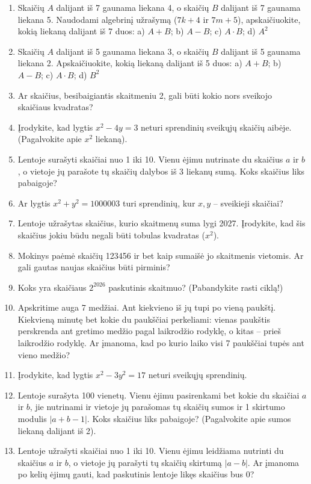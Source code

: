 \documentclass[11pt,a4paper]{scrartcl}
\begin{document}
\begin{enumerate}
    \renewcommand{\labelenumi}{\textbf{\theenumi.}}
    \item Skaičių $A$ dalijant iš 7 gaunama liekana 4, o skaičių $B$ dalijant iš 7 gaunama liekana 5. Naudodami algebrinį užrašymą ($7k+4$ ir $7m+5$), apskaičiuokite, kokią liekaną dalijant iš 7 duos: a)  $A+B$; b)  $A - B$; c) $A  \cdot B$; d) $A ^{2}$ 
    \item Skaičių $A$ dalijant iš 5 gaunama liekana 3, o skaičių $B$ dalijant iš 5 gaunama liekana 2. Apskaičiuokite, kokią liekaną dalijant iš 5 duos: a)  $A+B$; b)  $A - B$; c) $A  \cdot B$; d) $B ^{2}$ 
    \item Ar skaičius, besibaigiantis skaitmeniu 2, gali būti kokio nors sveikojo skaičiaus kvadratas?
    \item Įrodykite, kad lygtis $x^2 - 4y = 3$ neturi sprendinių sveikųjų skaičių aibėje. (Pagalvokite apie $x^2$ liekaną).
    \item Lentoje surašyti skaičiai nuo 1 iki 10. Vienu ėjimu nutrinate du skaičius $a$ ir $b$, o vietoje jų parašote tų skaičių dalybos iš 3 liekanų sumą. Koks skaičius liks pabaigoje?
    \item Ar lygtis $x^2 + y^2 = 1000003$ turi sprendinių, kur $x, y$ – sveikieji skaičiai?
    \item Lentoje užrašytas skaičius, kurio skaitmenų suma lygi 2027. Įrodykite, kad šis skaičius jokiu būdu negali būti tobulas kvadratas ($x^2$).
    \item Mokinys paėmė skaičių 123456 ir bet kaip sumaišė jo skaitmenis vietomis. Ar gali gautas naujas skaičius būti pirminis?
    \item Koks yra skaičiaus $2^{2026}$ paskutinis skaitmuo? (Pabandykite rasti ciklą!)
    \item Apskritime auga 7 medžiai. Ant kiekvieno iš jų tupi po vieną paukštį. Kiekvieną minutę bet kokie du paukščiai perkeliami: vienas paukštis perskrenda ant gretimo medžio pagal laikrodžio rodyklę, o kitas – prieš laikrodžio rodyklę. Ar įmanoma, kad po kurio laiko visi 7 paukščiai tupės ant vieno medžio?
    \item Įrodykite, kad lygtis $x^2 - 3y^2 = 17$ neturi sveikųjų sprendinių.
    \item Lentoje surašyta 100 vienetų. Vienu ėjimu pasirenkami bet kokie du skaičiai $a$ ir $b$, jie nutrinami ir vietoje jų parašomas tų skaičių sumos ir 1 skirtumo modulis $|a+b-1|$. Koks skaičius liks pabaigoje? (Pagalvokite apie sumos liekaną dalijant iš 2).
    \item Lentoje užrašyti skaičiai nuo 1 iki 10. Vienu ėjimu leidžiama nutrinti du skaičius $a$ ir $b$, o vietoje jų parašyti tų skaičių skirtumą $|a-b|$. Ar įmanoma po kelių ėjimų gauti, kad paskutinis lentoje likęs skaičius bus 0? 

\end{enumerate}
\end{document}
